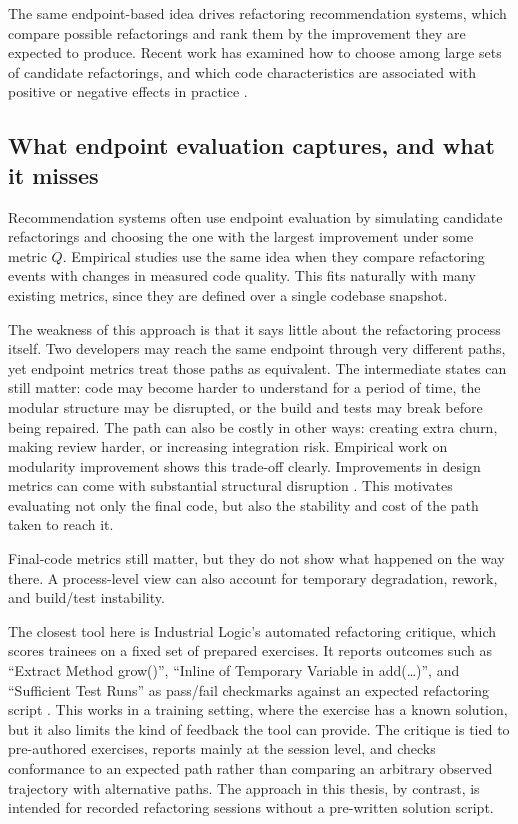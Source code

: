 The same endpoint-based idea drives refactoring recommendation systems, which compare possible refactorings and rank them by the improvement they are expected to produce. Recent work has examined how to choose among large sets of candidate refactorings, and which code characteristics are associated with positive or negative effects in practice \cite{nikolaidis2024metricsbased}.

\subsection{What endpoint evaluation captures, and what it misses}
Recommendation systems often use endpoint evaluation by simulating candidate refactorings and choosing the one with the largest improvement under some metric $Q$. Empirical studies use the same idea when they compare refactoring events with changes in measured code quality. This fits naturally with many existing metrics, since they are defined over a single codebase snapshot.

The weakness of this approach is that it says little about the refactoring process itself. Two developers may reach the same endpoint through very different paths, yet endpoint metrics treat those paths as equivalent. The intermediate states can still matter: code may become harder to understand for a period of time, the modular structure may be disrupted, or the build and tests may break before being repaired. The path can also be costly in other ways: creating extra churn, making review harder, or increasing integration risk. Empirical work on modularity improvement shows this trade-off clearly. Improvements in design metrics can come with substantial structural disruption \cite{paixao2017balancing}. This motivates evaluating not only the final code, but also the stability and cost of the path taken to reach it.

Final-code metrics still matter, but they do not show what happened on the way there. A process-level view can also account for temporary degradation, rework, and build/test instability.

The closest tool here is Industrial Logic's automated refactoring critique, which scores trainees on a fixed set of prepared exercises. It reports outcomes such as ``Extract Method grow()'', ``Inline of Temporary Variable in add(\dots)'', and ``Sufficient Test Runs'' as pass/fail checkmarks against an expected refactoring script \cite{industriallogic_critique}. This works in a training setting, where the exercise has a known solution, but it also limits the kind of feedback the tool can provide. The critique is tied to pre-authored exercises, reports mainly at the session level, and checks conformance to an expected path rather than comparing an arbitrary observed trajectory with alternative paths. The approach in this thesis, by contrast, is intended for recorded refactoring sessions without a pre-written solution script.

